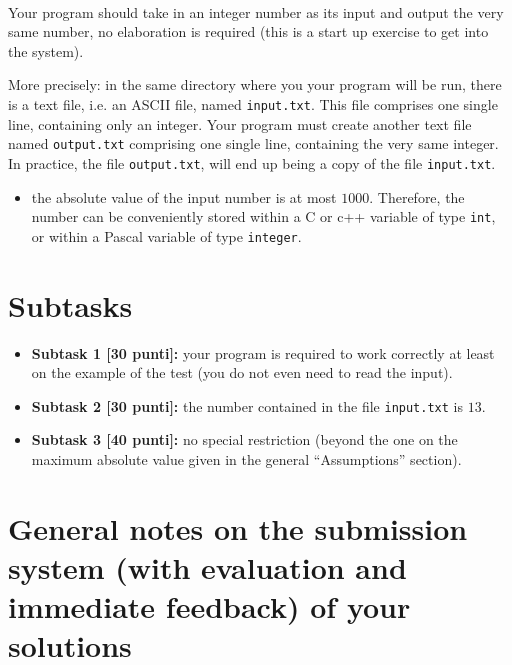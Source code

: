 \renewcommand{\nomebreve}{io\_file}
\renewcommand{\titolo}{Managing {\bf i}nput and {\bf o}utput from file}

\mbox{\ }
\vspace{-1.2cm}

\introduzione{}

Your program should take in an integer number as its input
and output the very same number, no elaboration is required  
(this is a start up exercise to get into the system).

More precisely:
in the same directory where you your program will be run,
there is a text file, i.e. an ASCII file, named \texttt{input.txt}.
This file comprises one single line, containing only an integer.
Your program must create another text file named \texttt{output.txt}
comprising one single line, containing the very same integer.
In practice, the file \texttt{output.txt},
will end up being a copy of the file \texttt{input.txt}.

   

\begin{itemize}[nolistsep, noitemsep]
  \item the absolute value of the input number is at most $1000$.
        Therefore, the number can be conveniently stored within 
        a C or c++ variable of type \texttt{int}, or within 
        a Pascal variable of type \texttt{integer}.
\end{itemize}
  
  \section*{Subtasks}
  \begin{itemize}
    \item \textbf{Subtask 1 [30 punti]:} your program is required to work correctly at least on the example of the test (you do not even need to read the input).
    \item \textbf{Subtask 2 [30 punti]:} the number contained in the file \texttt{input.txt} is $13$.
    \item \textbf{Subtask 3 [40 punti]:} no special restriction (beyond the one on the maximum absolute value given in the general ``Assumptions'' section).
  \end{itemize}


  \section*{General notes on the submission system (with evaluation and immediate feedback) of your solutions}

